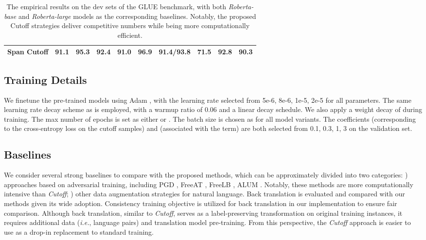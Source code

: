 \documentclass[11pt,a4paper]{article}
\begin{document}
\begin{table*}[ht!]
\begin{small}
\begin{tabular}{c||c|c|c|c|c|c|c|c|c}
			Span Cutoff  &  \textbf{91.1} &  95.3  & 92.4 & 91.0 &  96.9 & \textbf{91.4}/\textbf{93.8} & \textbf{71.5} & \textbf{92.8} & \textbf{90.3} \\
			\bottomrule[1.2pt]
		\end{tabular}\caption{The empirical results on the dev sets of the GLUE benchmark, with both \emph{Roberta-base} and \emph{Roberta-large} models as the corresponding baselines. Notably, the proposed Cutoff strategies deliver competitive numbers while being more computationally efficient.}
		\label{tab:eval}
	\end{small}
	\vspace{-2mm}
\end{table*}

\subsection{Training Details}
We finetune the pre-trained models using Adam \cite{kingma2014adam}, with the learning rate selected from 5e-6, 8e-6, 1e-5, 2e-5 for all parameters. The same learning rate decay scheme as \cite{liu2019roberta} is employed, with a warmup ratio of 0.06 and a linear decay schedule. We also apply a weight decay  of  during training. The max number of epochs is set as either  or . The batch size is chosen as  for all model variants. The coefficients  (corresponding to the cross-entropy loss on the cutoff samples) and  (associated with the  term) are both selected from 0.1, 0.3, 1, 3 on the validation set.

\subsection{Baselines}
We consider several strong baselines to compare with the proposed methods, which can be approximately divided into two categories: \emph{}) approaches based on adversarial training, including PGD \cite{Madry2018TowardsDL},  FreeAT \cite{shafahi2019adversarial}, FreeLB \cite{zhu2019freelb}, ALUM \cite{liu2020adversarial}. Notably, these methods are more computationally intensive than \emph{Cutoff}; \emph{}) other data augmentation strategies for natural language. Back translation is evaluated and compared with our methods given its wide adoption. Consistency training objective is utilized for back translation in our implementation to ensure fair comparison. Although back translation, similar to \emph{Cutoff}, serves as a label-preserving transformation on original training instances, it requires additional data (\emph{i.e.}, language pairs) and translation model pre-training. From this perspective, the \emph{Cutoff} approach is easier to use as a drop-in replacement to standard training.
\end{document}
